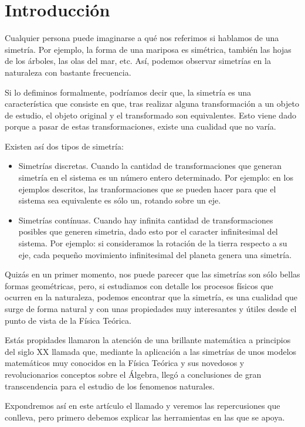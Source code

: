 \section{Introducción}\label{sec:introduccion}

Cualquier persona puede imaginarse a qué nos referimos si hablamos de una simetría. Por ejemplo, la forma de una mariposa es simétrica, también las hojas de los árboles, las olas del mar, etc. Así, podemos observar simetrías en la naturaleza con bastante frecuencia.

Si lo defiminos formalmente, podríamos decir que, la simetría es una característica que consiste en que, tras realizar alguna transformación a un objeto de estudio, el objeto original y el transformado son equivalentes. Esto viene dado porque a pasar de estas transformaciones, existe una cualidad que no varía.

Existen así dos tipos de simetría:
\begin{itemize}
    \item Simetrías discretas. Cuando la cantidad de transformaciones que generan simetría en el sistema es un número entero determinado. Por ejemplo: en los ejemplos descritos, las tranformaciones que se pueden hacer para que el sistema sea equivalente es sólo un, rotando sobre un eje.
    \item Simetrías contínuas. Cuando hay infinita cantidad de transformaciones posibles que generen simetria, dado esto por el caracter infinitesimal del sistema. Por ejemplo: si consideramos la rotación de la tierra respecto a su eje, cada pequeño movimiento infinitesimal del planeta genera una simetría.
\end{itemize}

Quizás en un primer momento, nos puede parecer que las simetrías son sólo bellas formas geométricas, pero, si estudiamos con detalle los procesos físicos que ocurren en la naturaleza, podemos encontrar que la simetría, es una cualidad que surge de forma natural y con unas propiedades muy interesantes y útiles desde el punto de vista de la Física Teórica.

Estás propidades llamaron la atención de una brillante matemática a principios del siglo XX llamada   que, mediante la aplicación a las simetrías de unos modelos matemáticos muy conocidos en la Física Teórica y sus novedosos y revolucionarios conceptos sobre el Álgebra, llegó a conclusiones de gran transcendencia para el estudio de los fenomenos naturales.

Expondremos así en este artículo el llamado   y veremos las repercusiones que conlleva, pero primero debemos explicar las herramientas en las que se apoya. 